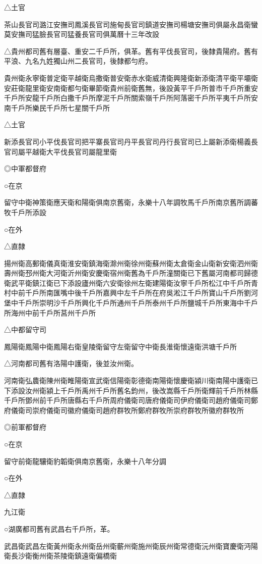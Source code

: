 △土官

茶山長官司潞江安撫司鳳溪長官司施甸長官司鎮道安撫司楊塘安撫司俱屬永昌衛蠻莫安撫司猛臉長官司猛養長官司俱萬曆十三年改設

△貴州都司舊有層臺、重安二千戶所，俱革。舊有平伐長官司，後隸貴陽府。舊有平浪、九名九姓獨山州二長官司，後隸都勻府。

貴州衛永寧衛普定衛平越衛烏撒衛普安衛赤水衛威清衛興隆衛新添衛清平衛平壩衛安莊衛龍里衛安南衛都勻衛畢節衛貴州前衛舊無，後設黃平千戶所普市千戶所重安千戶所安龍千戶所白撒千戶所摩泥千戶所關索嶺千戶所阿落密千戶所平夷千戶所安南千戶所樂民千戶所七星關千戶所

△土官

新添長官司小平伐長官司把平寨長官司丹平長官司丹行長官司已上屬新添衛楊義長官司屬平越衛大平伐長官司屬龍里衛

◎中軍都督府

○在京

留守中衛神策衛應天衛和陽衛俱南京舊衛，永樂十八年調牧馬千戶所南京舊所調蕃牧千戶所添設

○在外

△直隸

揚州衛高郵衛儀真衛淮安衛鎮海衛滁州衛徐州衛蘇州衛太倉衛金山衛新安衛泗州衛壽州衛邳州衛大河衛沂州衛安慶衛宿州衛舊為千戶所潼關衛已下舊屬河南都司歸德衛武平衛鎮江衛已下添設廬州衛六安衛徐州左衛建陽衛汝寧千戶所松江中千戶所青村中前千戶所南匯嘴中後千戶所嘉興中左千戶所在府吳淞江千戶所寶山千戶所劉河堡中千戶所崇明沙千戶所興化千戶所通州千戶所泰州千戶所鹽城千戶所東海中千戶所海州中前千戶所莒州千戶所

△中都留守司

鳳陽衛鳳陽中衛鳳陽右衛皇陵衛留守左衛留守中衛長淮衛懷遠衛洪塘千戶所

△河南都司舊有洛陽中護衛，後並汝州衛。

河南衛弘農衛陳州衛睢陽衛宣武衛信陽衛彰德衛南陽衛懷慶衛潁川衛南陽中護衛已下添設汝州衛潁上千戶所禹州千戶所舊名鈞州，後改嵩縣千戶所衛輝前千戶所林縣千戶所鄧州前千戶所唐縣右千戶所周府儀衛司唐府儀衛司伊府儀衛司趙府儀衛司鄭府儀衛司崇府儀衛司徽府儀衛司趙府群牧所鄭府群牧所崇府群牧所徽府群牧所

◎前軍都督府

○在京

留守前衛龍驤衛豹韜衛俱南京舊衛，永樂十八年分調

○在外

△直隸

九江衛

○湖廣都司舊有武昌右千戶所，革。

武昌衛武昌左衛黃州衛永州衛岳州衛蘄州衛施州衛辰州衛常德衛沅州衛寶慶衛沔陽衛長沙衛衡州衛茶陵衛鎮遠衛偏橋衛

